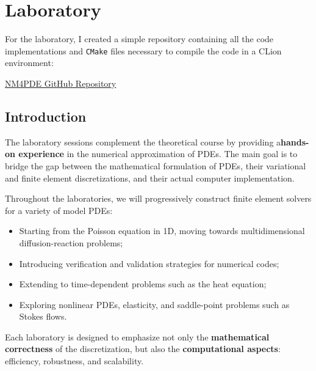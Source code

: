 \section{Laboratory}

For the laboratory, I created a simple repository containing all the code implementations and \texttt{CMake} files necessary to compile the code in a CLion environment:
\begin{center}
    \href{https://github.com/PoliMI-HPC-E-notes-projects-AndreVale69/NM4PDE-labs}{NM4PDE GitHub Repository} \hspace{1em} 
\end{center}

\subsection{Introduction}

The laboratory sessions complement the theoretical course by providing a\break \textbf{hands-on experience} in the numerical approximation of PDEs. The main goal is to bridge the gap between the mathematical formulation of PDEs, their variational and finite element discretizations, and their actual computer implementation.

\highspace
Throughout the laboratories, we will progressively construct finite element solvers for a variety of model PDEs:
\begin{itemize}
    \item Starting from the Poisson equation in 1D, moving towards multidimensional diffusion-reaction problems;
    \item Introducing verification and validation strategies for numerical codes;
    \item Extending to time-dependent problems such as the heat equation;
    \item Exploring nonlinear PDEs, elasticity, and saddle-point problems such as Stokes flows.
\end{itemize}
Each laboratory is designed to emphasize not only the \textbf{mathematical correctness} of the discretization, but also the \textbf{computational aspects}: efficiency, robustness, and scalability.

